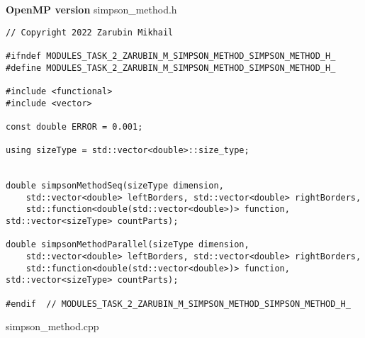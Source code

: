 \documentclass{report}
\begin{document}
\textbf{OpenMP version}
\newline
\newline simpson\_method.h
\begin{lstlisting}
// Copyright 2022 Zarubin Mikhail

#ifndef MODULES_TASK_2_ZARUBIN_M_SIMPSON_METHOD_SIMPSON_METHOD_H_
#define MODULES_TASK_2_ZARUBIN_M_SIMPSON_METHOD_SIMPSON_METHOD_H_

#include <functional>
#include <vector>

const double ERROR = 0.001;

using sizeType = std::vector<double>::size_type;


double simpsonMethodSeq(sizeType dimension,
    std::vector<double> leftBorders, std::vector<double> rightBorders,
    std::function<double(std::vector<double>)> function, std::vector<sizeType> countParts);

double simpsonMethodParallel(sizeType dimension,
    std::vector<double> leftBorders, std::vector<double> rightBorders,
    std::function<double(std::vector<double>)> function, std::vector<sizeType> countParts);

#endif  // MODULES_TASK_2_ZARUBIN_M_SIMPSON_METHOD_SIMPSON_METHOD_H_

\end{lstlisting}
simpson\_method.cpp
\end{document}
